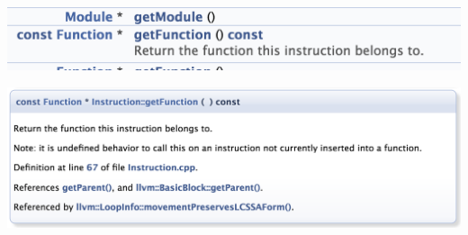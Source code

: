\documentclass[a4paper,12pt,twoside]{book}
\begin{document}
\begin{itemize}
	\includegraphics[scale=0.45]{pics/dox1.png} \newline
	
	\includegraphics[scale=0.45]{pics/dox2.png} 
	
\end{itemize}
\end{document}
